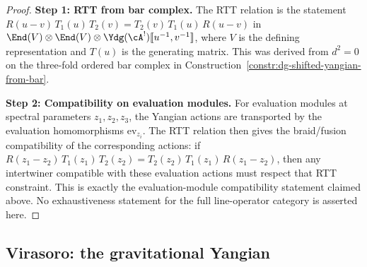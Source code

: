 \begin{proof}
\textbf{Step 1: RTT from bar complex.}
The RTT relation is the statement
$R(u{-}v)\,T_1(u)\,T_2(v)=T_2(v)\,T_1(u)\,R(u{-}v)$
in $\End(V)\otimes\End(V)\otimes\Ydg(\cA^!)[\![u^{-1},v^{-1}]\!]$,
where $V$ is the defining representation and $T(u)$ is
the generating matrix. This was derived from $d^2=0$ on
the three-fold ordered bar complex in
Construction~\ref{constr:dg-shifted-yangian-from-bar}.

\textbf{Step 2: Compatibility on evaluation modules.}
For evaluation modules at spectral parameters $z_1,z_2,z_3$, the Yangian
actions are transported by the evaluation homomorphisms
$\mathrm{ev}_{z_i}$. The RTT relation then gives the braid/fusion
compatibility of the corresponding actions: if
$R(z_1{-}z_2)\,T_1(z_1)\,T_2(z_2)
=T_2(z_2)\,T_1(z_1)\,R(z_1{-}z_2)$,
then any intertwiner compatible with these evaluation actions must
respect that RTT constraint. This is exactly the evaluation-module
compatibility statement claimed above. No exhaustiveness statement for
the full line-operator category is asserted here.
\end{proof}

\subsection{Virasoro: the gravitational Yangian}

